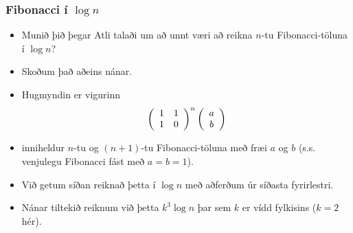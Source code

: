 \documentclass{beamer}
\begin{document}
\begin{frame}
	\frametitle{Fibonacci í $\log n$}
	\begin{itemize}
		\item<1-> Munið þið þegar Atli talaði um að unnt væri að reikna $n$-tu Fibonacci-töluna í $\log n$?
		\item<2-> Skoðum það aðeins nánar.
		\item<3-> Hugmyndin er vigurinn 
			\[
				\left (
				\begin{array}{c c}
					1 & 1\\
					1 & 0
				\end{array}
				\right )^n
				\left (
				\begin{array}{c}
					a\\
					b
				\end{array}
				\right )
			\]
		\item<4-> inniheldur $n$-tu og $(n + 1)$-tu Fibonacci-töluna með fræi $a$ og $b$ 
			(s.s. venjulegu Fibonacci fást með $a = b = 1$).
		\item<5-> Við getum síðan reiknað þetta í $\log n$ með aðferðum úr síðasta fyrirlestri.
		\item<6-> Nánar tiltekið reiknum við þetta $k^3 \log n$ þar sem $k$ er vídd fylkisins ($k = 2$ hér).
	\end{itemize}
\end{frame}
\end{document}
